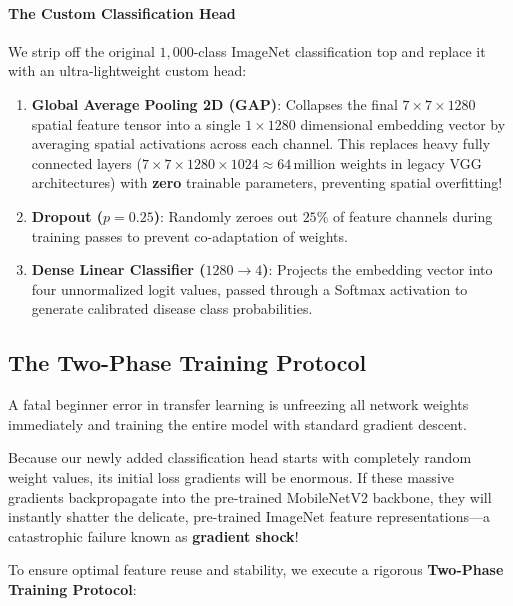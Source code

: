 \paragraph{The Custom Classification Head}
We strip off the original $1{,}000$-class ImageNet classification top and replace it with an ultra-lightweight custom head:
\begin{enumerate}
    \item \textbf{Global Average Pooling 2D (GAP)}: Collapses the final $7 \times 7 \times 1280$ spatial feature tensor into a single $1 \times 1280$ dimensional embedding vector by averaging spatial activations across each channel. This replaces heavy fully connected layers ($7 \times 7 \times 1280 \times 1024 \approx 64\,\text{million weights}$ in legacy VGG architectures) with \textbf{zero} trainable parameters, preventing spatial overfitting!
    \item \textbf{Dropout ($p = 0.25$)}: Randomly zeroes out $25\%$ of feature channels during training passes to prevent co-adaptation of weights.
    \item \textbf{Dense Linear Classifier ($1280 \to 4$)}: Projects the embedding vector into four unnormalized logit values, passed through a Softmax activation to generate calibrated disease class probabilities.
\end{enumerate}

\subsection{The Two-Phase Training Protocol}\label{subsec:p2_training_protocol}

A fatal beginner error in transfer learning is unfreezing all network weights immediately and training the entire model with standard gradient descent. 

Because our newly added classification head starts with completely random weight values, its initial loss gradients will be enormous. If these massive gradients backpropagate into the pre-trained MobileNetV2 backbone, they will instantly shatter the delicate, pre-trained ImageNet feature representations—a catastrophic failure known as \textbf{gradient shock}!

To ensure optimal feature reuse and stability, we execute a rigorous \textbf{Two-Phase Training Protocol}:

